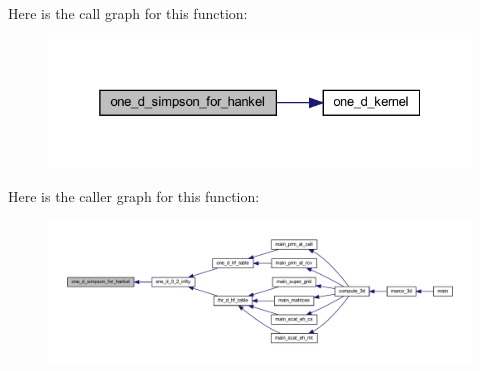 Here is the call graph for this function\+:
\nopagebreak
\begin{figure}[H]
\begin{center}
\leavevmode
\includegraphics[width=325pt]{Marco_8f90_ae2b61db0662a54d96d5e7f9a663349de_cgraph}
\end{center}
\end{figure}
Here is the caller graph for this function\+:
\nopagebreak
\begin{figure}[H]
\begin{center}
\leavevmode
\includegraphics[width=350pt]{Marco_8f90_ae2b61db0662a54d96d5e7f9a663349de_icgraph}
\end{center}
\end{figure}
\mbox{\label{Marco_8f90_a278c841b3ca2d9c2a1e36c458d370cbe}} 
